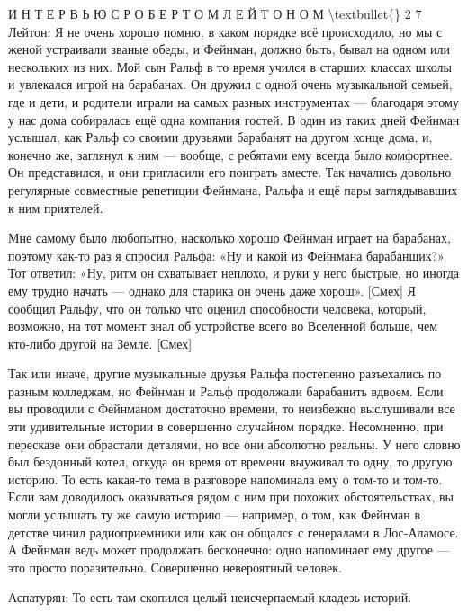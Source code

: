 \documentclass[10pt,oneside]{article}
\begin{document}
И Н Т Е Р В Ь Ю   С   Р О Б Е Р Т О М   Л Е Й Т О Н О М \textbackslash{}textbullet\{\} 2 7 Лейтон: Я не очень хорошо помню, в каком порядке всё происходило, но мы с женой устраивали званые обеды, и Фейнман, должно быть, бывал на одном или нескольких из них. Мой сын Ральф в то время учился в старших классах школы и увлекался игрой на барабанах. Он дружил с одной очень музыкальной семьей, где и дети, и родители играли на самых разных инструментах --- благодаря этому у нас дома собиралась ещё одна компания гостей. В один из таких дней Фейнман услышал, как Ральф со своими друзьями барабанят на другом конце дома, и, конечно же, заглянул к ним --- вообще, с ребятами ему всегда было комфортнее. Он представился, и они пригласили его поиграть вместе. Так начались довольно регулярные совместные репетиции Фейнмана, Ральфа и ещё пары заглядывавших к ним приятелей.\par

Мне самому было любопытно, насколько хорошо Фейнман играет на барабанах, поэтому как-то раз я спросил Ральфа: «Ну и какой из Фейнмана барабанщик?» Тот ответил: «Ну, ритм он схватывает неплохо, и руки у него быстрые, но иногда ему трудно начать --- однако для старика он очень даже хорош». [Смех] Я сообщил Ральфу, что он только что оценил способности человека, который, возможно, на тот момент знал об устройстве всего во Вселенной больше, чем кто-либо другой на Земле. [Смех]\par

Так или иначе, другие музыкальные друзья Ральфа постепенно разъехались по разным колледжам, но Фейнман и Ральф продолжали барабанить вдвоем. Если вы проводили с Фейнманом достаточно времени, то неизбежно выслушивали все эти удивительные истории в совершенно случайном порядке. Несомненно, при пересказе они обрастали деталями, но все они абсолютно реальны. У него словно был бездонный котел, откуда он время от времени выуживал то одну, то другую историю. То есть какая-то тема в разговоре напоминала ему о том-то и том-то. Если вам доводилось оказываться рядом с ним при похожих обстоятельствах, вы могли услышать ту же самую историю --- например, о том, как Фейнман в детстве чинил радиоприемники или как он общался с генералами в Лос-Аламосе. А Фейнман ведь может продолжать бесконечно: одно напоминает ему другое --- это просто поразительно. Совершенно невероятный человек.\par

Аспатурян: То есть там скопился целый неисчерпаемый кладезь историй.\par
\end{document}
